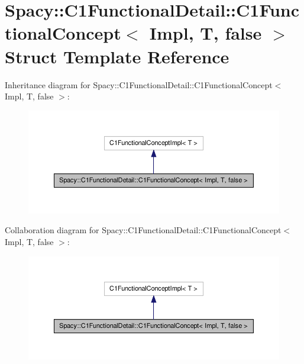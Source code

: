 \hypertarget{structSpacy_1_1C1FunctionalDetail_1_1C1FunctionalConcept_3_01Impl_00_01T_00_01false_01_4}{\section{\-Spacy\-:\-:\-C1\-Functional\-Detail\-:\-:\-C1\-Functional\-Concept$<$ \-Impl, \-T, false $>$ \-Struct \-Template \-Reference}
\label{structSpacy_1_1C1FunctionalDetail_1_1C1FunctionalConcept_3_01Impl_00_01T_00_01false_01_4}
}


\-Inheritance diagram for \-Spacy\-:\-:\-C1\-Functional\-Detail\-:\-:\-C1\-Functional\-Concept$<$ \-Impl, \-T, false $>$\-:
\nopagebreak
\begin{figure}[H]
\begin{center}
\leavevmode
\includegraphics[width=350pt]{structSpacy_1_1C1FunctionalDetail_1_1C1FunctionalConcept_3_01Impl_00_01T_00_01false_01_4__inherit__graph}
\end{center}
\end{figure}


\-Collaboration diagram for \-Spacy\-:\-:\-C1\-Functional\-Detail\-:\-:\-C1\-Functional\-Concept$<$ \-Impl, \-T, false $>$\-:
\nopagebreak
\begin{figure}[H]
\begin{center}
\leavevmode
\includegraphics[width=350pt]{structSpacy_1_1C1FunctionalDetail_1_1C1FunctionalConcept_3_01Impl_00_01T_00_01false_01_4__coll__graph}
\end{center}
\end{figure}

